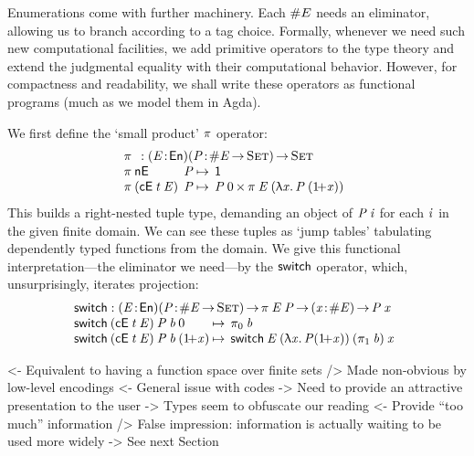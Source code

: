 Enumerations come with further machinery. Each \(\EnumT{E}\) needs an
eliminator, allowing us to branch according to a tag choice. Formally,
whenever we need such new computational facilities, we add primitive
operators to the type theory and extend the judgmental equality with
their computational behavior. However, for compactness and readability, we
shall write these operators as functional programs (much as we
model them in Agda).

We first define the `small product' $\SYMBspi$ operator:
%
\[\stk{
\spi{}{}: \PITEL{\V{E}}{\EnumU}\PITEL{\V{P}}{\EnumT{\V{E}} \To \Set} \To \Set \\
\begin{array}{@{}l@{\:}l@{\:\mapsto\:\:}l}
\spi{\NilE}{& \V{P}}        & \Unit \\
\spi{(\ConsE{\V{t}}{\V{E}})}{& \V{P}} & \TIMES{\V{P}\: \Ze}{\spi{\V{E}}{(\LAM{\V{x}} \V{P}\: (\Su{\V{x}}))}}
\end{array}
}\]
%
This builds a right-nested
tuple type, demanding an object of $\V{P}\:\V{i}$ for each $\V{i}$ in the given finite
domain. We can see these tuples as `jump tables' tabulating dependently
typed functions from the domain. We give this functional
interpretation---the eliminator we need---by the
$\SYMBswitch$ operator, which, unsurprisingly, iterates projection:
%
\[\stk{
\begin{array}{@{}ll}
\SYMBswitch : \PITEL{\V{E}}{\EnumU}
               \PITEL{\V{P}}{\EnumT{\V{E}} \To \Set} \To
              \spi{\V{E}}{\V{P}} \To
               \PITEL{\V{x}}{\EnumT{\V{E}}} \To \V{P}\: \x
\end{array} \\
\begin{array}{@{}l@{\:\mapsto\:\:}l}
\switch{(\ConsE{\V{t}}{\V{E}})}{\V{P}}{\V{b}}{\Ze}      & \fst{\V{b}} \\
\switch{(\ConsE{\V{t}}{\V{E}})}{\V{P}}{\V{b}}{(\Su{\V{x}})} & \switch{\V{E}}{(\LAM{\V{x}} \V{P}
  (\Su{\V{x}}))}{(\snd{\V{b}})}{\V{x}}
\end{array}
}\]


\begin{wstructure}
<- Equivalent to having a function space over finite sets
    /> Made non-obvious by low-level encodings
        <- General issue with codes
             -> Need to provide an attractive presentation to the user
    -> Types seem to obfuscate our reading
        <- Provide ``too much'' information
        /> False impression: information is actually waiting to be used more widely
        -> See next Section
\end{wstructure}

